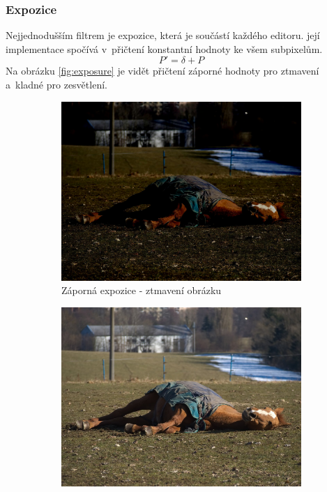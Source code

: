 \documentclass[11pt, a4paper, titlepage]{article}
\begin{document}
\subsubsection{Expozice}
Nejjednodušším filtrem je expozice, která je součástí každého editoru.
její implementace spočívá v~přičtení konstantní hodnoty ke všem subpixelům.
$$P' = \delta + P$$
Na obrázku \ref{fig:exposure} je vidět přičtení záporné hodnoty pro ztmavení a~kladné pro zesvětlení.
\begin{figure}[h]
    \centering
    \begin{subfigure}[t]{0.25\textwidth}
        \vskip 0pt
        \includegraphics[width=1.0\textwidth]{horse_exposure_minus.jpg}
        \caption{Záporná expozice - ztmavení obrázku}
    \end{subfigure}
    \hspace{1cm}
    \begin{subfigure}[t]{0.25\textwidth}
        \vskip 0pt
        \includegraphics[width=1.0\textwidth]{horse_original.jpg}

\end{subfigure}
\end{figure}
\end{document}

